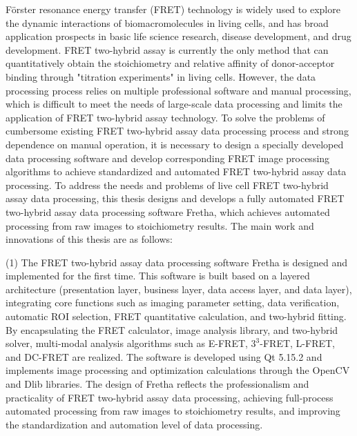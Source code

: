 \begin{eabstract}

Förster resonance energy transfer (FRET) technology is widely used to explore the dynamic interactions of biomacromolecules in living cells, and has broad application prospects in basic life science research, disease development, and drug development.
FRET two-hybrid assay is currently the only method that can quantitatively obtain the stoichiometry and relative affinity of donor-acceptor binding through "titration experiments" in living cells.
However, the data processing process relies on multiple professional software and manual processing, which is difficult to meet the needs of large-scale data processing and limits the application of FRET two-hybrid assay technology.
To solve the problems of cumbersome existing FRET two-hybrid assay data processing process and strong dependence on manual operation, it is necessary to design a specially developed data processing software and develop corresponding FRET image processing algorithms to achieve standardized and automated FRET two-hybrid assay data processing.
To address the needs and problems of live cell FRET two-hybrid assay data processing, this thesis designs and develops a fully automated FRET two-hybrid assay data processing software Fretha, which achieves automated processing from raw images to stoichiometry results.
The main work and innovations of this thesis are as follows:

(1) The FRET two-hybrid assay data processing software Fretha is designed and implemented for the first time.
This software is built based on a layered architecture (presentation layer, business layer, data access layer, and data layer), integrating core functions such as imaging parameter setting, data verification, automatic ROI selection, FRET quantitative calculation, and two-hybrid fitting.
By encapsulating the FRET calculator, image analysis library, and two-hybrid solver, multi-modal analysis algorithms such as E-FRET, $3^3$-FRET, L-FRET, and DC-FRET are realized.
The software is developed using Qt 5.15.2 and implements image processing and optimization calculations through the OpenCV and Dlib libraries.
The design of Fretha reflects the professionalism and practicality of FRET two-hybrid assay data processing, achieving full-process automated processing from raw images to stoichiometry results, and improving the standardization and automation level of data processing.


\end{eabstract}
